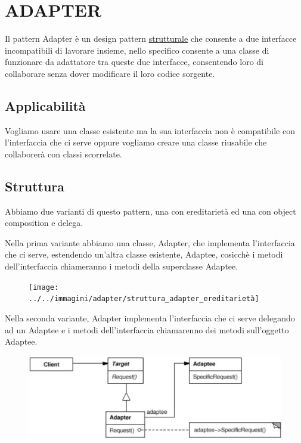 \chapter{ADAPTER}

Il pattern Adapter è un design pattern \underline{strutturale} che consente a due interfacce incompatibili di lavorare insieme, nello specifico consente a una classe di 
funzionare da adattatore tra queste due interfacce, consentendo loro di collaborare senza dover modificare il loro codice sorgente.

\section{Applicabilità}

Vogliamo usare una classe esistente ma la sua interfaccia non è compatibile con l'interfaccia che ci serve oppure vogliamo creare una classe riusabile che collaborerà 
con classi scorrelate.

\section{Struttura}

Abbiamo due varianti di questo pattern, una con ereditarietà ed una con object composition e delega.

Nella prima variante abbiamo una classe, Adapter, che implementa l'interfaccia che ci serve, estendendo un'altra classe esistente, Adaptee, cosicchè i metodi 
dell'interfaccia chiameranno i metodi della superclasse Adaptee.

\begin{figure}[H]
    \centering 
    \texttt{[image: ../../immagini/adapter/struttura\_adapter\_ereditarietà]}    
\end{figure}

Nella seconda variante, Adapter implementa l'interfaccia che ci serve delegando ad un Adaptee e i metodi dell'interfaccia chiamarenno dei metodi sull'oggetto Adaptee.

\begin{figure}[H]
    \centering
    \includegraphics[width=0.5\linewidth]{../../immagini/adapter/struttura_adapter_composition}
\end{figure}

